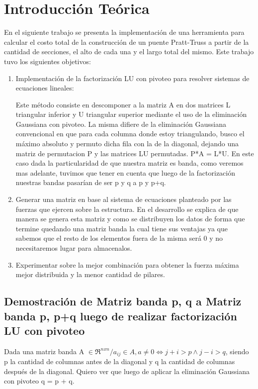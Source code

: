 \section{Introducci\'on Te\'orica}

En el siguiente trabajo se presenta la implementaci\'on de una herramienta para calcular el costo total de la construcci\'on de un puente Pratt-Truss
a partir de la cantidad de secciones, el alto de cada una y el largo total del mismo. Este trabajo tuvo los siguientes objetivos:

\begin{enumerate}
 \item Implementaci\'on de la factorizaci\'on LU con pivoteo para resolver sistemas de ecuaciones lineales:\newline

    Este m\'etodo consiste en descomponer a la matriz A en dos matrices L triangular inferior y U triangular superior mediante el uso de la eliminaci\'on
Gaussiana con pivoteo. La misma difiere de la eliminaci\'on Gaussiana convencional en que para cada columna donde estoy triangulando, busco el m\'aximo
absoluto y permuto dicha fila con la de la diagonal, dejando una matriz de permutacion P y las matrices LU permutadas. P*A = L*U. En este caso dada la 
particularidad de que nuestra matriz es banda, como veremos mas adelante, tuvimos que tener en cuenta que luego de la factorizaci\'on nuestras bandas 
pasar\'ian de ser p y q a p y p+q.

\item Generar una matriz en base al sistema de ecuaciones planteado por las fuerzas que ejercen sobre la estructura. En el desarrollo se explica de 
que manera se genera esta matriz y como se distribuyen los datos de forma que termine quedando una matriz banda la cual tiene sus ventajas ya que sabemos
que el resto de los elementos fuera de la misma ser\'a 0 y no necesitaremos lugar para almacenalos. \newline

\item Experimentar sobre la mejor combinaci\'on para obtener la fuerza m\'axima mejor distribuida y la menor cantidad de pilares.\newline
\end{enumerate}

\subsection{Demostraci\'on de Matriz banda p, q a Matriz banda p, p+q luego de realizar factorizaci\'on LU con pivoteo}
Dada una matriz banda A $\in \Re^{nxn} / a_{ij} \in A, a \neq 0 \Longleftrightarrow j+i > p \wedge j-i > q$, siendo p la cantidad de columnas antes de la
diagonal y q la cantidad de columnas despu\'es de la diagonal. Quiero ver que luego de aplicar la eliminaci\'on Gaussiana con pivoteo q = p + q.\newline


